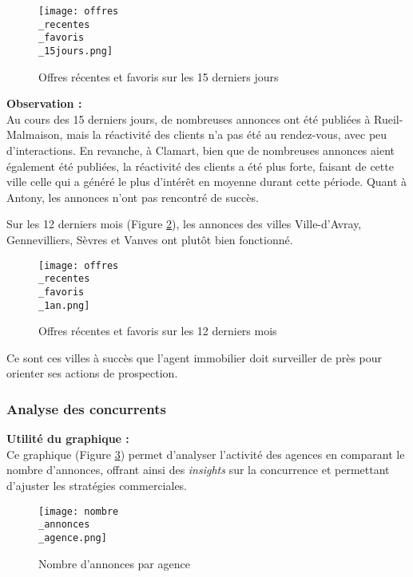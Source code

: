 \documentclass[a4paper, 12pt, twoside]{report}
\begin{document}
			\begin{figure}[h]
				\centering
				\texttt{[image: offres\\\_recentes\\\_favoris\\\_15jours.png]}
				\caption{Offres récentes et favoris sur les 15 derniers jours}
				\label{offresRecentesFavoris15jours}
			\end{figure}

			{\bf Observation :} \\
			
			Au cours des 15 derniers jours, de nombreuses annonces ont été publiées à Rueil-Malmaison, mais la réactivité des clients n’a pas été au rendez-vous, avec peu d’interactions. En revanche, à Clamart, bien que de nombreuses annonces aient également été publiées, la réactivité des clients a été plus forte, faisant de cette ville celle qui a généré le plus d’intérêt en moyenne durant cette période. Quant à Antony, les annonces n’ont pas rencontré de succès.

			Sur les 12 derniers mois (Figure \ref{offresRecentesFavoris1an}), les annonces des villes Ville-d’Avray, Gennevilliers, Sèvres et Vanves ont plutôt bien fonctionné.

			\begin{figure}[h]
				\centering
				\texttt{[image: offres\\\_recentes\\\_favoris\\\_1an.png]}
				\caption{Offres récentes et favoris sur les 12 derniers mois}
				\label{offresRecentesFavoris1an}
			\end{figure}	

			Ce sont ces villes à succès que l’agent immobilier doit surveiller de près pour orienter ses actions de prospection.

			\subsubsection{Analyse des concurrents}

			{\bf Utilité du graphique :} \\

			Ce graphique (Figure \ref{nombreAnnoncesAgence}) permet d'analyser l'activité des agences en comparant le nombre d'annonces, offrant ainsi des {\it insights} sur la concurrence et permettant d'ajuster les stratégies commerciales. \\

			\begin{figure}[h]
				\centering
				\texttt{[image: nombre\\\_annonces\\\_agence.png]}
				\caption{Nombre d'annonces par agence}
				\label{nombreAnnoncesAgence}
			\end{figure}	
\end{document}

